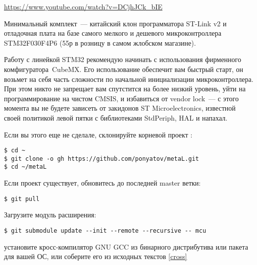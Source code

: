 \secdown

\url{https://www.youtube.com/watch?v=DCjhJCk_bIE}

\href{https://www.aliexpress.com/item/FREE-SHIPPING-ST-Link-V2-stlink-mini-STM8STM32-STLINK-simulator-download-programming-With-Cover/1814606455.html}{}
\href{https://www.aliexpress.com/item/48-MHz-STM32F030F4P6-Small-Systems-Development-Board-CORTEX-M0-Core-32bit-Mini-System-Development-Panels/32831635311.html}{}

Минимальный комплект\ --- китайский клон программатора ST-Link v2 и отладочная
плата на базе самого мелкого и дешевого микроконтроллера STM32F030F4P6 (55р в
розницу в самом жлобском магазине).

\bigskip
Работу с линейкой STM32 рекомендую начинать с использования фирменного
комфигуратора\ CubeMX.
Его использование обеспечит вам быстрый старт, он возьмет на себя часть
сложности по начальной инициализации микроконтроллера. При этом никто не
запрещает вам спутстится на более низкий уровень, уйти на программирование на
чистом CMSIS, и избавиться от vendor lock\ --- с этого момента вы не будете
зависеть от закидонов ST Microelectronics, известной своей политикой левой пятки
с библиотеками StdPeriph, HAL и напахал.


\noindent
Если вы этого еще не сделале, склонируйте корневой проект \metal:

\begin{verbatim}
$ cd ~
$ git clone -o gh https://github.com/ponyatov/metaL.git
$ cd ~/metaL
\end{verbatim}
Если проект существует, обновитесь до последней master ветки:
\begin{verbatim}
$ git pull
\end{verbatim}
Загрузите модуль расширения:
\begin{verbatim}
$ git submodule update --init --remote --recursive -- mcu
\end{verbatim}
установите кросс-компилятор GNU GCC из бинарного дистрибутива или пакета для
вашей ОС, или соберите его из исходных текстов
\ref{cross}

